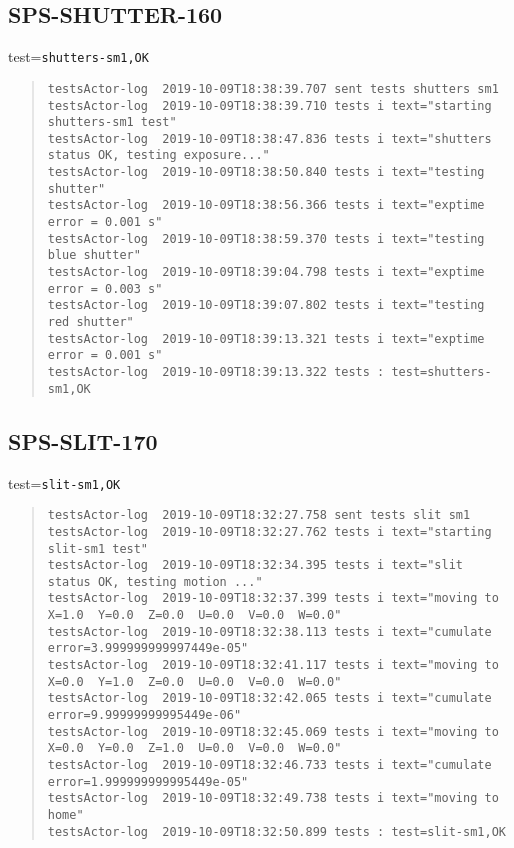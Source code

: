 \subsection{SPS-SHUTTER-160}
\label{sec:tc-160}

test=\texttt{shutters-sm1,OK}

\begin{quote}
\begin{tiny}
\begin{verbatim}
testsActor-log  2019-10-09T18:38:39.707 sent tests shutters sm1
testsActor-log  2019-10-09T18:38:39.710 tests i text="starting shutters-sm1 test"
testsActor-log  2019-10-09T18:38:47.836 tests i text="shutters status OK, testing exposure..."
testsActor-log  2019-10-09T18:38:50.840 tests i text="testing  shutter"
testsActor-log  2019-10-09T18:38:56.366 tests i text="exptime error = 0.001 s"
testsActor-log  2019-10-09T18:38:59.370 tests i text="testing blue shutter"
testsActor-log  2019-10-09T18:39:04.798 tests i text="exptime error = 0.003 s"
testsActor-log  2019-10-09T18:39:07.802 tests i text="testing red shutter"
testsActor-log  2019-10-09T18:39:13.321 tests i text="exptime error = 0.001 s"
testsActor-log  2019-10-09T18:39:13.322 tests : test=shutters-sm1,OK
\end{verbatim}
\end{tiny}
\end{quote}


\subsection{SPS-SLIT-170}
\label{sec:tc-170}

test=\texttt{slit-sm1,OK}

\begin{quote}
\begin{tiny}
\begin{verbatim}
testsActor-log  2019-10-09T18:32:27.758 sent tests slit sm1
testsActor-log  2019-10-09T18:32:27.762 tests i text="starting slit-sm1 test"
testsActor-log  2019-10-09T18:32:34.395 tests i text="slit status OK, testing motion ..."
testsActor-log  2019-10-09T18:32:37.399 tests i text="moving to X=1.0  Y=0.0  Z=0.0  U=0.0  V=0.0  W=0.0"
testsActor-log  2019-10-09T18:32:38.113 tests i text="cumulate error=3.999999999997449e-05"
testsActor-log  2019-10-09T18:32:41.117 tests i text="moving to X=0.0  Y=1.0  Z=0.0  U=0.0  V=0.0  W=0.0"
testsActor-log  2019-10-09T18:32:42.065 tests i text="cumulate error=9.99999999995449e-06"
testsActor-log  2019-10-09T18:32:45.069 tests i text="moving to X=0.0  Y=0.0  Z=1.0  U=0.0  V=0.0  W=0.0"
testsActor-log  2019-10-09T18:32:46.733 tests i text="cumulate error=1.999999999995449e-05"
testsActor-log  2019-10-09T18:32:49.738 tests i text="moving to home"
testsActor-log  2019-10-09T18:32:50.899 tests : test=slit-sm1,OK
\end{verbatim}
\end{tiny}
\end{quote}



